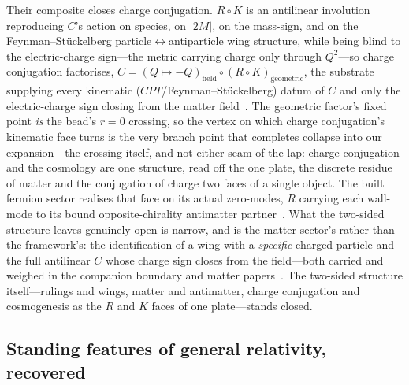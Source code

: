 \documentclass[11pt,a4paper]{article}
\theoremstyle{plain}
\theoremstyle{definition}
\theoremstyle{remark}
\begin{document}
Their composite closes charge conjugation. $R\circ K$ is an antilinear involution reproducing $C$'s action on species, on $|2M|$, on the mass-sign, and on the Feynman--St\"uckelberg particle$\leftrightarrow$antiparticle wing structure, while being blind to the electric-charge sign---the metric carrying charge only through $Q^{2}$---so charge conjugation factorises, $C=(Q\mapsto-Q)_{\mathrm{field}}\circ(R\circ K)_{\mathrm{geometric}}$, the substrate supplying every kinematic ($CPT$/Feynman--St\"uckelberg) datum of $C$ and only the electric-charge sign closing from the matter field~\cite{JanzenBoundary}. The geometric factor's fixed point \emph{is} the bead's $r=0$ crossing, so the vertex on which charge conjugation's kinematic face turns is the very branch point that completes collapse into our expansion---the crossing itself, and not either seam of the lap: charge conjugation and the cosmology are one structure, read off the one plate, the discrete residue of matter and the conjugation of charge two faces of a single object. The built fermion sector realises that face on its actual zero-modes, $R$ carrying each wall-mode to its bound opposite-chirality antimatter partner~\cite{JanzenMatter}. What the two-sided structure leaves genuinely open is narrow, and is the matter sector's rather than the framework's: the identification of a wing with a \emph{specific} charged particle and the full antilinear $C$ whose charge sign closes from the field---both carried and weighed in the companion boundary and matter papers~\cite{JanzenBoundary,JanzenMatter}. The two-sided structure itself---rulings and wings, matter and antimatter, charge conjugation and cosmogenesis as the $R$ and $K$ faces of one plate---stands closed.

\subsection{Standing features of general relativity, recovered}
\end{document}
